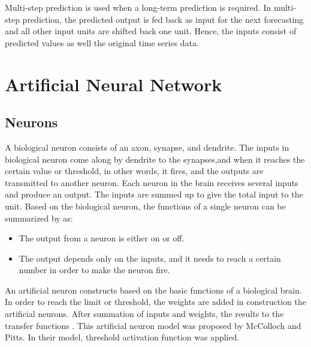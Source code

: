 Multi-step prediction is used when a long-term prediction is required. In multi-step prediction, the predicted output is fed back as input for the next forecasting and all other input units are shifted back one unit. Hence, the inputs consist of predicted values as well the original  time series data.

\section{Artificial Neural Network}
\subsection{Neurons}

A biological neuron consists of an axon, synapse, and dendrite. The inputs in biological  neuron come along by dendrite to the synapses,and when it reaches  the certain value or threshold, in other words, it fires,  and the outputs are transmitted  to another neuron. Each neuron in the brain receives several inputs and produce  an output. The inputs  are summed up to give the total input to the unit. Based on the biological neuron, the functions of a single neuron can be summarized by  as:
\begin{itemize}
	\item The output from a neuron is either on or off.
	\item The output depends only on the inputs, and it  needs to reach a certain number in order to make the neuron fire.
\end{itemize}

An artificial neuron constructs based on the basic functions of  a biological brain. In order to reach the limit or threshold,  the weights are added in construction the artificial neurons. After summation of inputs and weights, the results  to the  transfer functions . This artificial neuron model was proposed by McColloch and Pitts. In their model, threshold activation function was applied.


